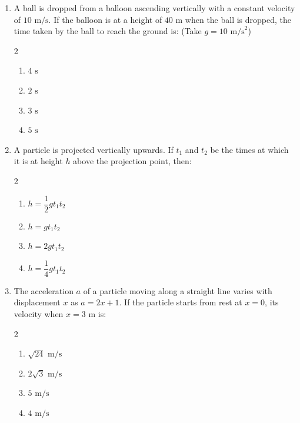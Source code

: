 \documentclass[11pt,a4paper]{article}
\begin{document}
\begin{enumerate}[label=\textbf{\textcolor{l2Amber}{Q\arabic*.}},leftmargin=24pt,itemsep=10pt,start=26]
  \item A ball is dropped from a balloon ascending vertically with a constant velocity of $10\text{ m/s}$. If the balloon is at a height of $40\text{ m}$ when the ball is dropped, the time taken by the ball to reach the ground is: (Take $g = 10\text{ m/s}^2$)
  \begin{multicols}{2}
  \begin{enumerate}[label=\textbf{\textcolor{primaryDark}{(\Alph*)}},itemsep=2pt]
    \item $4\text{ s}$
    \item $2\text{ s}$
    \item $3\text{ s}$
    \item $5\text{ s}$
  \end{enumerate}
  \end{multicols}

  \item A particle is projected vertically upwards. If $t_1$ and $t_2$ be the times at which it is at height $h$ above the projection point, then:
  \begin{multicols}{2}
  \begin{enumerate}[label=\textbf{\textcolor{primaryDark}{(\Alph*)}},itemsep=2pt]
    \item $h = \dfrac{1}{2}gt_1 t_2$
    \item $h = gt_1 t_2$
    \item $h = 2gt_1 t_2$
    \item $h = \dfrac{1}{4}gt_1 t_2$
  \end{enumerate}
  \end{multicols}

  \item The acceleration $a$ of a particle moving along a straight line varies with displacement $x$ as $a = 2x + 1$. If the particle starts from rest at $x = 0$, its velocity when $x = 3\text{ m}$ is:
  \begin{multicols}{2}
  \begin{enumerate}[label=\textbf{\textcolor{primaryDark}{(\Alph*)}},itemsep=2pt]
    \item $\sqrt{24}\text{ m/s}$
    \item $2\sqrt{3}\text{ m/s}$
    \item $5\text{ m/s}$
    \item $4\text{ m/s}$
  \end{enumerate}
  \end{multicols}


\end{enumerate}
\end{document}
